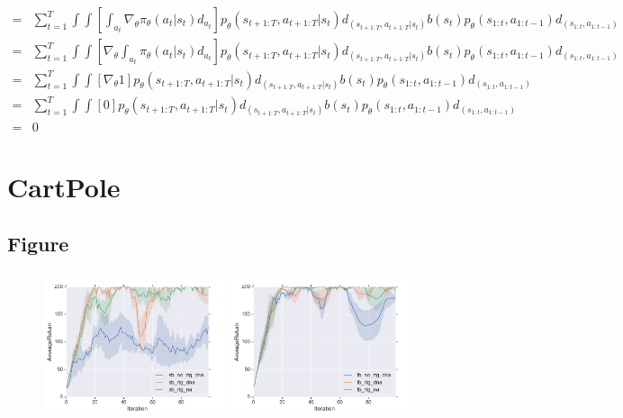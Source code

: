 \documentclass[12pt]{article}
\begin{document}
\begin{align*}
	= & \sum_{t=1}^{T} \int \int \left[\int_{a_t} \nabla_\theta  \pi_\theta(a_t|s_t) d_{a_t} \right] p_\theta(s_{t+1:T}, a_{t+1:T}|s_t) d_{(s_{t+1:T}, a_{t+1:T}|s_t)}   b(s_t) p_\theta(s_{1:t}, a_{1:t-1}) d_{(s_{1:t}, a_{1:t-1})} \\
	= & \sum_{t=1}^{T} \int \int \left[ \nabla_\theta  \int_{a_t} \pi_\theta(a_t|s_t) d_{a_t} \right] p_\theta(s_{t+1:T}, a_{t+1:T}|s_t) d_{(s_{t+1:T}, a_{t+1:T}|s_t)}   b(s_t) p_\theta(s_{1:t}, a_{1:t-1}) d_{(s_{1:t}, a_{1:t-1})} \\
	= & \sum_{t=1}^{T} \int \int \left[ \nabla_\theta  1 \right] p_\theta(s_{t+1:T}, a_{t+1:T}|s_t) d_{(s_{t+1:T}, a_{t+1:T}|s_t)}   b(s_t) p_\theta(s_{1:t}, a_{1:t-1}) d_{(s_{1:t}, a_{1:t-1})} \\
	= & \sum_{t=1}^{T} \int \int \left[ 0 \right] p_\theta(s_{t+1:T}, a_{t+1:T}|s_t) d_{(s_{t+1:T}, a_{t+1:T}|s_t)}   b(s_t) p_\theta(s_{1:t}, a_{1:t-1}) d_{(s_{1:t}, a_{1:t-1})} \\
	= & 0
	\end{align*}
	
	\section{CartPole}
	
	\subsection{Figure}
	
	\begin{figure}[!htbp]
		\includegraphics[width=0.48\textwidth]{problem4a.png}
		\includegraphics[width=0.48\textwidth]{problem4b.png}
	\end{figure}
\end{document}
